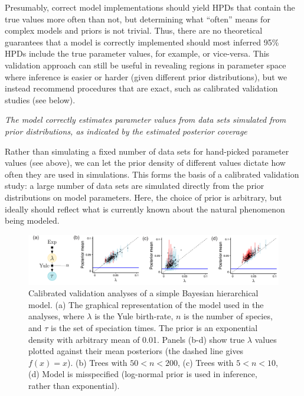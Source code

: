 \documentclass[oneside]{article}
\begin{document}
Presumably, correct model implementations should yield HPDs that contain
the true values more often than not, but determining what ``often'' means
for complex models and priors is not trivial.
Thus, there are no theoretical guarantees that a model is correctly
implemented should most inferred 95\% HPDs include the true parameter
values, for example, or vice-versa.
This validation approach can still be useful in revealing regions
in parameter space where inference is easier or harder (given different
prior distributions), but we instead recommend procedures that are exact,
such as calibrated validation studies (see below).

\vspace{.5cm}
\noindent \emph{The model correctly estimates parameter values from
  data sets simulated from prior distributions, as indicated by the
  estimated posterior coverage}

Rather than simulating a fixed number of data sets for hand-picked
parameter values (see above), we can let the prior density of
different values dictate how often they are used in simulations.
This forms the basis of a calibrated validation study: a large number
of data sets are simulated directly from the prior distributions on
model parameters.
Here, the choice of prior is arbitrary, but ideally should reflect
what is currently known about the natural phenomenon being modeled.

\begin{figure}
  \includegraphics[width=\textwidth]{../figures/yule_calval.pdf}
  \caption{Calibrated validation analyses of a simple Bayesian
    hierarchical model. (a) The graphical representation of the model used in
    the analyses, where $\lambda$ is the Yule birth-rate, $n$ is the
    number of species, and $\tau$ is the set of speciation times. The
    prior is an exponential density with arbitrary mean of 0.01. Panels (b-d)
    show true $\lambda$ values plotted against their mean posteriors
    (the dashed line gives $f(x) = x$). (b) Trees
    with $50<n<200$, (c) Trees with $5<n<10$, (d) Model is
    misspecified (log-normal prior is used in inference, rather than exponential).
  }
  \label{fig:yulecalval}
\end{figure}
\end{document}
